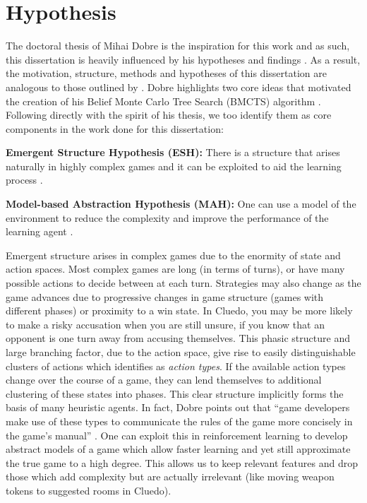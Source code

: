 \documentclass[msc, ai, twoside, notimes, logo, parskip, leftchapter, normalheadings]{infthesis}
\begin{document}
\section{Hypothesis}
The doctoral thesis of Mihai Dobre is the inspiration for this work and as such, this dissertation is heavily influenced by his hypotheses and findings \citep{Mihai}. As a result, the motivation, structure, methods and hypotheses of this dissertation are analogous to those outlined by \citep{Mihai}. Dobre highlights two core ideas that motivated the creation of his Belief Monte Carlo Tree Search (BMCTS) algorithm \citep{Mihai}. Following directly with the spirit of his thesis, we too identify them as core components in the work done for this dissertation:
\begin{description}
\item \textbf{Emergent Structure Hypothesis (ESH):} There is a structure that arises naturally in highly complex games and it can be exploited to aid the learning process \citep{Mihai}.
\item \textbf{Model-based Abstraction Hypothesis (MAH):} One can use a model of the environment to reduce the complexity and improve the performance of the learning agent \citep{Mihai}.
\end{description}
Emergent structure arises in complex games due to the enormity of state and action spaces. Most complex games are long (in terms of turns), or have many possible actions to decide between at each turn. Strategies may also change as the game advances due to progressive changes in game structure (games with different phases) or proximity to a win state. In Cluedo, you may be more likely to make a risky accusation when you are still unsure, if you know that an opponent is one turn away from accusing themselves. This phasic structure and large branching factor, due to the action space, give rise to easily distinguishable clusters of actions which \citep{Mihai} identifies as \textit{action types}. If the available action types change over the course of a game, they can lend themselves to additional clustering of these states into phases. This clear structure implicitly forms the basis of many heuristic agents. In fact, Dobre points out that ``game developers make use of these types to communicate the rules of the game more concisely in the game's manual'' \citep{Mihai}. One can exploit this in reinforcement learning to develop abstract models of a game which allow faster learning and yet still approximate the true game to a high degree. This allows us to keep relevant features and drop those which add complexity but are actually irrelevant (like moving weapon tokens to suggested rooms in Cluedo).
\end{document}
